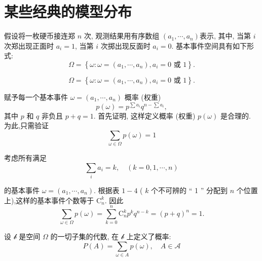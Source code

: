 \section{某些经典的模型分布}

 假设将一枚硬币接连郑 $n$ 次, 观测结果用有序数组 $\left(a_1, \cdots, a_n\right)$表示, 其中, 当第 $i$ 次郑出现正面时 $a_i=1$, 当第 $i$ 次掷出现反面时 $a_i=0$. 基本事件空间具有如下形式:
$$
\Omega=\left\{\omega: \omega=\left(a_1, \cdots, a_n\right), a_i=0 \text { 或 } 1\right\} .
$$

$$
\Omega=\left\{\omega: \omega=\left(a_1, \cdots, a_n\right), a_i=0 \text { 或 } 1\right\} .
$$

赋予每一个基本事件 $\omega=\left(a_1, \cdots, a_n\right)$ 概率 (权重)
$$
p(\omega)=p^{\sum a_i} q^{n-\sum a_i},
$$
其中 $p$ 和 $q$ 非负且 $p+q=1$. 首先证明, 这样定义概率 (权重) $p(\omega)$ 是合理的. 为此,只需验证
$$
\sum_{\omega \in \Omega} p(\omega)=1
$$

考虑所有满足
$$
\sum_i a_i=k, \quad(k=0,1, \cdots, n)
$$

的基本事件 $\omega=\left(a_1, \cdots, a_n\right)$. 根据表 $1-4$ ( $k$ 个不可辨的 `` 1 '' 分配到 $n$ 个位置上),这样的基本事件个数等于 $\mathrm{C}_n^k$. 因此
$$
\sum_{\omega \in \Omega} p(\omega)=\sum_{k=0}^n \mathrm{C}_n^k p^k q^{n-k}=(p+q)^n=1 .
$$

设 $\mathscr{b}$ 是空间 $\Omega$ 的一切子集的代数, 在 $\mathscr{b}$ 上定义了概率:
$$
P(A)=\sum_{\omega \in A} p(\omega), \quad A \in \mathscr{A}
$$